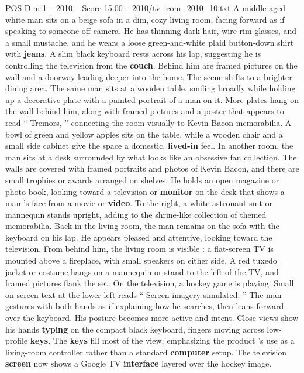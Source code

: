 \begin{textsample}{POS Dim 1 – 2010 – Score 15.00 – 2010/tv\_com\_2010\_10.txt}  \label{ex:f1_pos_029}
A middle-aged white man sits on a beige sofa in a dim, cozy living room, facing forward as if speaking to someone off camera.
He has thinning dark hair, wire-rim glasses, and a small mustache, and he wears a loose green-and-white plaid button-down shirt with \textbf{jeans}.
A slim black keyboard rests across his lap, suggesting he is controlling the television from the \textbf{couch}.
Behind him are framed pictures on the wall and a doorway leading deeper into the home.
The scene shifts to a brighter dining area.
The same man sits at a wooden table, smiling broadly while holding up a decorative plate with a painted portrait of a man on it.
More plates hang on the wall behind him, along with framed pictures and a poster that appears to read “ Tremors, ” connecting the room visually to Kevin Bacon memorabilia.
A bowl of green and yellow apples sits on the table, while a wooden chair and a small side cabinet give the space a domestic, \textbf{lived-in} feel.
In another room, the man sits at a desk surrounded by what looks like an obsessive fan collection.
The walls are covered with framed portraits and photos of Kevin Bacon, and there are small trophies or awards arranged on shelves.
He holds an open magazine or photo book, looking toward a television or \textbf{monitor} on the desk that shows a man ’s face from a movie or \textbf{video}.
To the right, a white astronaut suit or mannequin stands upright, adding to the shrine-like collection of themed memorabilia.
Back in the living room, the man remains on the sofa with the keyboard on his lap.
He appears pleased and attentive, looking toward the television.
From behind him, the living room is visible : a flat-screen TV is mounted above a fireplace, with small speakers on either side.
A red tuxedo jacket or costume hangs on a mannequin or stand to the left of the TV, and framed pictures flank the set.
On the television, a hockey game is playing.
Small on-screen text at the lower left reads “ Screen imagery simulated. ” The man gestures with both hands as if explaining how he searches, then leans forward over the keyboard.
His posture becomes more active and intent.
Close views show his hands \textbf{typing} on the compact black keyboard, fingers moving across low-profile \textbf{keys}.
The \textbf{keys} fill most of the view, emphasizing the product ’s use as a living-room controller rather than a standard \textbf{computer} setup.
The television \textbf{screen} now shows a Google TV \textbf{interface} layered over the hockey image.

\end{textsample}
